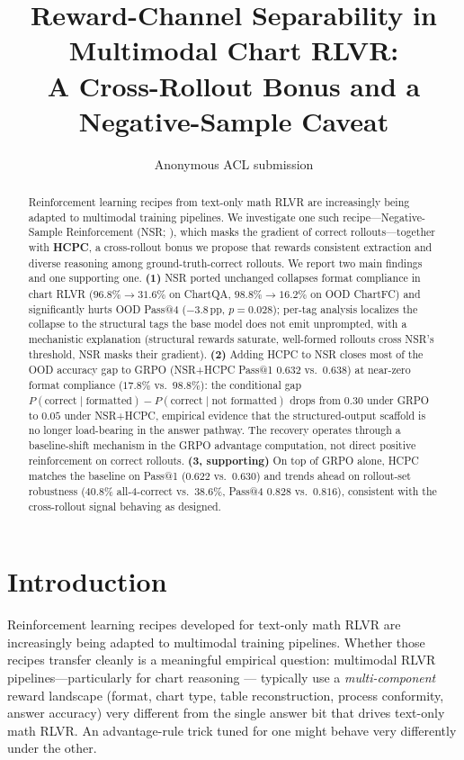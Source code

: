 \documentclass[11pt]{article}
\title{Reward-Channel Separability in Multimodal Chart RLVR:\\
A Cross-Rollout Bonus and a Negative-Sample Caveat}
\author{Anonymous ACL submission}
\begin{document}
\maketitle

\begin{abstract}
Reinforcement learning recipes from text-only math RLVR are
increasingly being adapted to multimodal training pipelines. We
investigate one such recipe---Negative-Sample Reinforcement (NSR;
\citealp{zhu2025nsr}), which masks the gradient of correct
rollouts---together with \textbf{HCPC}, a cross-rollout bonus we
propose that rewards consistent extraction and diverse reasoning
among ground-truth-correct rollouts. We report two main findings
and one supporting one. \textbf{(1)} NSR ported unchanged collapses
format compliance in chart RLVR
($96.8\%\!\to\!31.6\%$ on ChartQA,
$98.8\%\!\to\!16.2\%$ on OOD ChartFC) and significantly hurts OOD
Pass@4 ($-3.8$\,pp, $p{=}0.028$); per-tag analysis localizes the
collapse to the structural tags the base model does not emit
unprompted, with a mechanistic explanation (structural rewards
saturate, well-formed rollouts cross NSR's threshold, NSR masks
their gradient). \textbf{(2)} Adding HCPC to NSR closes most of the
OOD accuracy gap to GRPO (NSR+HCPC Pass@1 $0.632$ vs.\ $0.638$) at
near-zero format compliance ($17.8\%$ vs.\ $98.8\%$): the
conditional gap
$P(\text{correct}\mid\text{formatted}){-}P(\text{correct}\mid\text{not formatted})$
drops from $0.30$ under GRPO to $0.05$ under NSR+HCPC, empirical
evidence that the structured-output scaffold is no longer
load-bearing in the answer pathway. The recovery operates through a
baseline-shift mechanism in the GRPO advantage computation, not
direct positive reinforcement on correct rollouts.
\textbf{(3, supporting)} On top of GRPO alone, HCPC matches the
baseline on Pass@1 ($0.622$ vs.\ $0.630$) and trends ahead on
rollout-set robustness ($40.8\%$ all-4-correct vs.\ $38.6\%$, Pass@4
$0.828$ vs.\ $0.816$), consistent with the cross-rollout signal
behaving as designed.
\end{abstract}

\section{Introduction}
\label{sec:intro}

Reinforcement learning recipes developed for text-only math RLVR are
increasingly being adapted to multimodal training pipelines. Whether
those recipes transfer cleanly is a meaningful empirical question:
multimodal RLVR pipelines---particularly for chart reasoning
\citep{chartrvr2025,chartr12025,bigcharts2025,distill-vcr-2025}---
typically use a \emph{multi-component} reward landscape (format,
chart type, table reconstruction, process conformity, answer
accuracy) very different from the single answer bit that drives
text-only math RLVR. An advantage-rule trick tuned for one might
behave very differently under the other.
\end{document}
